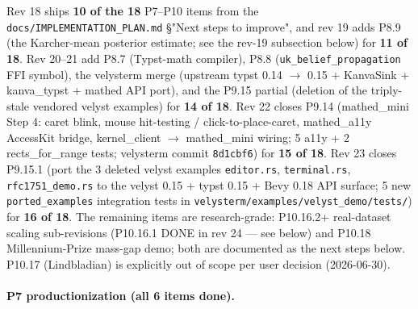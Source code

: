\documentclass[11pt, a4paper]{article}
\begin{document}
Rev 18 ships \textbf{10 of the 18} P7--P10 items from the
\texttt{docs/IMPLEMENTATION\_PLAN.md} \S"Next steps to improve",
  and rev 19 adds P8.9 (the Karcher-mean posterior estimate; see the
rev-19 subsection below) for \textbf{11 of 18}.
Rev 20--21 add P8.7 (Typst-math compiler), P8.8
(\texttt{uk\_belief\_propagation} FFI symbol), the velysterm
merge (upstream typst 0.14 $\to$ 0.15 + KanvaSink + kanva\_typst
+ mathed API port), and the P9.15 partial (deletion of the
triply-stale vendored velyst examples) for \textbf{14 of 18}.
Rev 22 closes P9.14 (mathed\_mini Step 4: caret blink,
mouse hit-testing / click-to-place-caret, mathed\_a11y
AccessKit bridge, kernel\_client $\to$ mathed\_mini wiring;
5 a11y + 2 rects\_for\_range tests; velysterm commit
\texttt{8d1cbf6}) for \textbf{15 of 18}.
Rev 23 closes P9.15.1 (port the 3 deleted velyst examples
\texttt{editor.rs}, \texttt{terminal.rs}, \texttt{rfc1751\_demo.rs}
to the velyst 0.15 + typst 0.15 + Bevy 0.18 API surface;
5 new \texttt{ported\_examples} integration tests in
\texttt{velysterm/examples/velyst\_demo/tests/}) for
\textbf{16 of 18}.
The remaining items are research-grade: P10.16.2+ real-dataset
scaling sub-revisions (P10.16.1 DONE in rev 24 --- see below)
and P10.18 Millennium-Prize mass-gap demo; both are documented
as the next steps below. P10.17 (Lindbladian)
is explicitly out of scope per user decision (2026-06-30).

\paragraph{P7 productionization (all 6 items done).}
\end{document}
